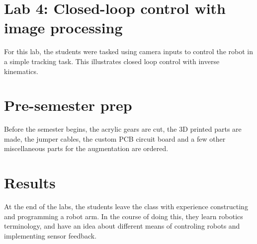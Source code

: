 \section{Lab  4: Closed-loop control with image processing}

For this lab, the students were tasked using camera inputs to control the robot in a simple tracking task. This illustrates closed loop control with inverse kinematics. 


\section{Pre-semester prep}
 
Before the semester begins, the acrylic gears are cut, the 3D printed parts are made, the jumper cables, the custom PCB circuit board and a few other miscellaneous parts for the augmentation are ordered.


\section{Results}

At the end of the labs, the students leave the class with experience constructing and programming a robot arm. In the course of doing this, they learn robotics terminology, and have an idea about different means of controling robots and implementing sensor feedback. 
